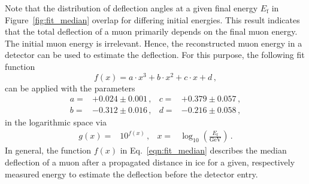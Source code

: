 \documentclass[pdflatex, sn-mathphys]{sn-jnl}%
\theoremstyle{thmstyleone}%
\theoremstyle{thmstyletwo}%
\theoremstyle{thmstylethree}%
\begin{document}
Note that the distribution of deflection angles at a given final energy $E_{\mathrm{f}}$ in Figure~\ref{fig:fit_median} overlap for differing initial energies. This result indicates that the total deflection of a muon 
primarily depends on the final muon energy.
The initial muon energy is irrelevant. 
Hence, the reconstructed muon 
energy in a detector can be used to estimate the deflection. For this 
purpose, the following fit function 
\begin{equation}
     f(x) = a \cdot x^3 + b \cdot x^2 + c \cdot x + d \,,
    \label{eqn:fit_median}
\end{equation}
can be applied with the parameters 
\begin{align}
    a =& +0.024 \pm 0.001\,,  & c =& +0.379 \pm 0.057\,,\\
    b =& -0.312 \pm 0.016\,,  & d =& -0.216 \pm 0.058\,,
\end{align}
in the logarithmic space via 
\begin{align}
    g(x) =& 10^{f(x)}\,, & x =& \log_{10}\left(\frac{E_{\text{f}}}{\si{\giga\electronvolt}}\right)\,.
\end{align}
In general, the function $f(x)$ in Eq.~\eqref{eqn:fit_median} describes the median 
deflection of a muon after a propagated distance in ice for a given, respectively measured energy 
to estimate the deflection before the detector entry.
\end{document}
